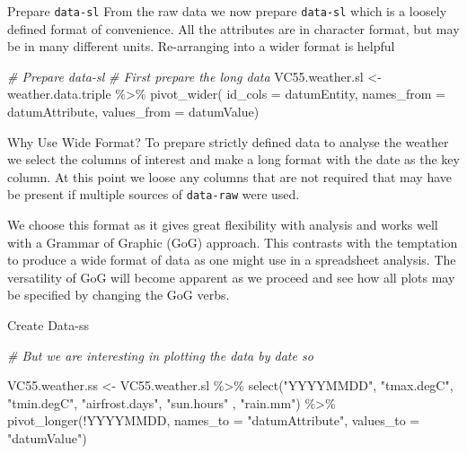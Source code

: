 \documentclass[
  ignorenonframetext,
]{beamer}
\newenvironment{Shaded}{\begin{snugshade}}{\end{snugshade}}
\newcommand{\AttributeTok}[1]{\textcolor[rgb]{0.77,0.63,0.00}{#1}}
\newcommand{\CommentTok}[1]{\textcolor[rgb]{0.56,0.35,0.01}{\textit{#1}}}
\newcommand{\FunctionTok}[1]{\textcolor[rgb]{0.00,0.00,0.00}{#1}}
\newcommand{\NormalTok}[1]{#1}
\newcommand{\OtherTok}[1]{\textcolor[rgb]{0.56,0.35,0.01}{#1}}
\newcommand{\SpecialCharTok}[1]{\textcolor[rgb]{0.00,0.00,0.00}{#1}}
\newcommand{\StringTok}[1]{\textcolor[rgb]{0.31,0.60,0.02}{#1}}
\begin{document}
\begin{frame}[fragile]{Prepare \texttt{data-sl}}
\protect\hypertarget{prepare-data-sl}{}
From the raw data we now prepare \texttt{data-sl} which is a loosely
defined format of convenience. All the attributes are in character
format, but may be in many different units. Re-arranging into a wider
format is helpful

\begin{Shaded}
\begin{Highlighting}[]
\CommentTok{\# Prepare data{-}sl}
\CommentTok{\# First prepare the long data}
\NormalTok{VC55.weather.sl }\OtherTok{\textless{}{-}}\NormalTok{ weather.data.triple }\SpecialCharTok{\%\textgreater{}\%}
                  \FunctionTok{pivot\_wider}\NormalTok{(}
  \AttributeTok{id\_cols =}\NormalTok{ datumEntity,}
  \AttributeTok{names\_from =}\NormalTok{ datumAttribute,}
  \AttributeTok{values\_from =}\NormalTok{ datumValue)}
\end{Highlighting}
\end{Shaded}
\end{frame}

\begin{frame}[fragile]{Why Use Wide Format?}
\protect\hypertarget{why-use-wide-format}{}
To prepare strictly defined data to analyse the weather we select the
columns of interest and make a long format with the date as the key
column. At this point we loose any columns that are not required that
may have be present if multiple sources of \texttt{data-raw} were used.

We choose this format as it gives great flexibility with analysis and
works well with a Grammar of Graphic (GoG) approach. This contrasts with
the temptation to produce a wide format of data as one might use in a
spreadsheet analysis. The versatility of GoG will become apparent as we
proceed and see how all plots may be specified by changing the GoG
verbs.
\end{frame}

\begin{frame}[fragile]{Create Data-ss}
\protect\hypertarget{create-data-ss}{}
\begin{Shaded}
\begin{Highlighting}[]
\CommentTok{\# But we are interesting in plotting the data by date so}

\NormalTok{  VC55.weather.ss }\OtherTok{\textless{}{-}}\NormalTok{ VC55.weather.sl }\SpecialCharTok{\%\textgreater{}\%} 
    \FunctionTok{select}\NormalTok{(}\StringTok{"YYYYMMDD"}\NormalTok{, }
           \StringTok{"tmax.degC"}\NormalTok{,}
           \StringTok{"tmin.degC"}\NormalTok{,}
           \StringTok{"airfrost.days"}\NormalTok{, }
           \StringTok{"sun.hours"}\NormalTok{ ,}
           \StringTok{"rain.mm"}\NormalTok{)     }\SpecialCharTok{\%\textgreater{}\%}
            \FunctionTok{pivot\_longer}\NormalTok{(}\SpecialCharTok{!}\NormalTok{YYYYMMDD,}
                  \AttributeTok{names\_to =} \StringTok{"datumAttribute"}\NormalTok{, }
                  \AttributeTok{values\_to =} \StringTok{"datumValue"}\NormalTok{) }
\end{Highlighting}
\end{Shaded}
\end{frame}
\end{document}
